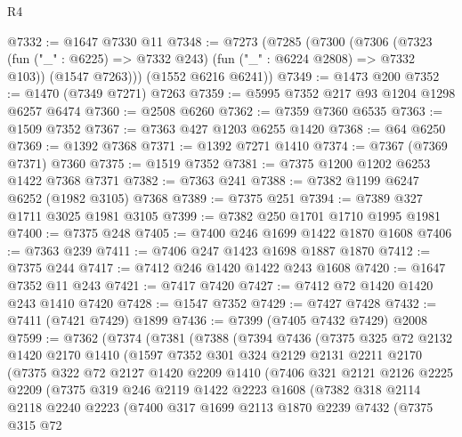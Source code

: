 \begin{lexlean}{R4}
\begin{coremodule}
@7332 := @1647 @7330 @11
@7348 := @7273
    (@7285
      (@7300
        (@7306
          (@7323 (fun ("_" : @6225) => @7332 @243) (fun ("_" : @6224 @2808) => @7332 @103))
          (@1547 @7263)))
      (@1552 @6216 @6241))
@7349 := @1473 @200
@7352 := @1470 (@7349 @7271) @7263
@7359 := @5995 @7352 @217 @93 @1204 @1298 @6257 @6474
@7360 := @2508 @6260
@7362 := @7359 @7360 @6535
@7363 := @1509 @7352
@7367 := @7363 @427 @1203 @6255 @1420
@7368 := @64 @6250
@7369 := @1392 @7368
@7371 := @1392 @7271 @1410
@7374 := @7367 (@7369 @7371) @7360
@7375 := @1519 @7352
@7381 := @7375 @1200 @1202 @6253 @1422 @7368 @7371
@7382 := @7363 @241
@7388 := @7382 @1199 @6247 @6252 (@1982 @3105) @7368
@7389 := @7375 @251
@7394 := @7389 @327 @1711 @3025 @1981 @3105
@7399 := @7382 @250 @1701 @1710 @1995 @1981
@7400 := @7375 @248
@7405 := @7400 @246 @1699 @1422 @1870 @1608
@7406 := @7363 @239
@7411 := @7406 @247 @1423 @1698 @1887 @1870
@7412 := @7375 @244
@7417 := @7412 @246 @1420 @1422 @243 @1608
@7420 := @1647 @7352 @11 @243
@7421 := @7417 @7420
@7427 := @7412 @72 @1420 @1420 @243 @1410 @7420
@7428 := @1547 @7352
@7429 := @7427 @7428
@7432 := @7411 (@7421 @7429) @1899
@7436 := @7399 (@7405 @7432 @7429) @2008
@7599 := @7362
    (@7374
      (@7381
        (@7388
          (@7394
            @7436
            (@7375
              @325
              @72
              @2132
              @1420
              @2170
              @1410
              (@1597
                @7352
                @301
                @324
                @2129
                @2131
                @2211
                @2170
                (@7375
                  @322
                  @72
                  @2127
                  @1420
                  @2209
                  @1410
                  (@7406
                    @321
                    @2121
                    @2126
                    @2225
                    @2209
                    (@7375
                      @319
                      @246
                      @2119
                      @1422
                      @2223
                      @1608
                      (@7382
                        @318
                        @2114
                        @2118
                        @2240
                        @2223
                        (@7400
                          @317
                          @1699
                          @2113
                          @1870
                          @2239
                          @7432
                          (@7375
                            @315
                            @72

\end{coremodule}
\end{lexlean}
